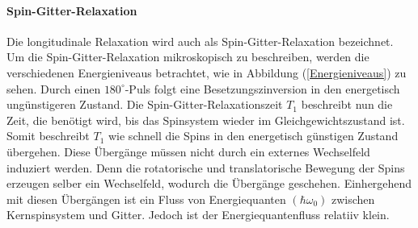 \paragraph{Spin-Gitter-Relaxation}
Die longitudinale Relaxation wird auch als Spin-Gitter-Relaxa{\-}tion bezeichnet.
Um die Spin-Gitter-Relaxation mikroskopisch zu beschreiben, werden die verschiedenen Energieniveaus betrachtet, wie in Abbildung (\ref{Energieniveaus}) zu sehen.
Durch einen $180^{\circ}$-Puls folgt eine Besetzungszinversion in den energetisch ung\"{u}nstigeren Zustand.
Die Spin-Gitter-Relaxationszeit $T_1$ beschreibt nun die Zeit, die ben\"{o}tigt wird, bis das Spinsystem wieder im Gleichgewichtszustand ist.
Somit beschreibt $T_1$ wie schnell  die Spins in den energetisch g\"{u}nstigen Zustand \"{u}bergehen.
Diese \"{U}berg\"{a}nge m\"{u}ssen nicht durch ein externes Wechselfeld induziert werden.
Denn die rotatorische und translatorische Bewegung der Spins erzeugen selber ein Wechselfeld, wodurch die \"{U}berg\"{a}nge geschehen.
Einhergehend mit diesen \"{U}berg\"{a}ngen ist ein Fluss von Energiequanten $(\hbar \omega_0)$ zwischen Kernspinsystem und Gitter.
Jedoch ist der Energiequantenfluss relatiiv klein.

